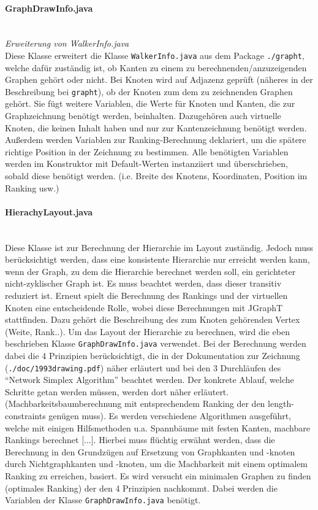 \documentclass[10pt,a4paper]{article}
\begin{document}
\paragraph{GraphDrawInfo.java}\ \\
\emph{Erweiterung von WalkerInfo.java}\\
{\footnotesize Diese Klasse erweitert die Klasse \texttt{WalkerInfo.java} aus dem Package \texttt{./grapht}, welche dafür zuständig ist, ob Kanten zu einem zu berechnenden/anzuzeigenden Graphen gehört oder nicht. Bei Knoten wird auf Adjazenz geprüft (näheres in der Beschreibung bei \texttt{grapht}), ob der Knoten zum dem zu zeichnenden Graphen gehört. Sie fügt weitere Variablen, die Werte für Knoten und Kanten, die zur Graphzeichnung benötigt werden, beinhalten. Dazugehören auch virtuelle Knoten, die keinen Inhalt haben und nur zur Kantenzeichnung benötigt werden. Außerdem werden Variablen zur Ranking-Berechnung deklariert, um die spätere richtige Position in der Zeichnung zu bestimmen. Alle benötigten Variablen werden im Konstruktor mit Default-Werten instanziiert und überschrieben, sobald diese benötigt werden. (i.e. Breite des Knotens, Koordinaten, Position im Ranking usw.)}

\paragraph{HierachyLayout.java}\ \\
{\footnotesize Diese Klasse ist zur Berechnung der Hierarchie im Layout zuständig. Jedoch muss berücksichtigt werden, dass eine konsistente Hierarchie nur erreicht werden kann, wenn der Graph, zu dem die Hierarchie berechnet werden soll, ein gerichteter nicht-zyklischer Graph ist. Es muss beachtet werden, dass dieser transitiv reduziert ist. Erneut spielt die Berechnung des Rankings und der virtuellen Knoten eine entscheidende Rolle, wobei diese Berechnungen mit JGraphT stattfinden. Dazu gehört die Beschreibung des zum Knoten gehörenden Vertex (Weite, Rank..). Um das Layout der Hierarchie zu berechnen, wird die eben beschrieben Klasse \texttt{GraphDrawInfo.java} verwendet. Bei der Berechnung werden dabei die 4 Prinzipien berücksichtigt, die in der Dokumentation zur Zeichnung (\texttt{./doc/1993drawing.pdf}) näher erläutert und bei den 3 Durchläufen des "`Network Simplex Algorithm"' beachtet werden. Der konkrete Ablauf, welche Schritte getan werden müssen, werden dort näher erläutert. (Machbarkeitsbaumberechnung mit entsprechendem Ranking der den length-constraints genügen muss).  Es werden verschiedene Algorithmen ausgeführt, welche mit einigen Hilfsmethoden u.a. Spannbäume mit festen Kanten, machbare Rankings berechnet [...]. Hierbei muss flüchtig erwähnt werden, dass die Berechnung in den Grundzügen auf Ersetzung von Graphkanten und -knoten durch Nichtgraphkanten und -knoten, um die Machbarkeit mit einem optimalem Ranking zu erreichen, basiert. Es wird versucht ein minimalen Graphen zu finden (optimales Ranking) der den 4 Prinzipien nachkommt. Dabei werden die Variablen der Klasse \texttt{GraphDrawInfo.java} benötigt.} 
\end{document}
